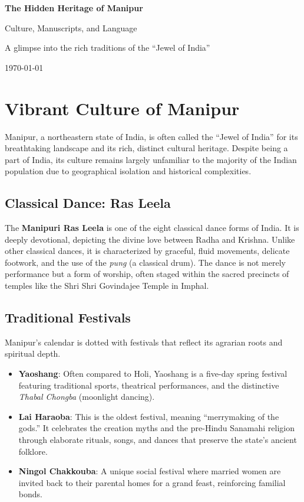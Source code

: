 \documentclass{article}
\begin{document}
\begin{titlepage}
    \centering
    \vspace*{2cm}
    {\Huge\bfseries The Hidden Heritage of Manipur\par}
    \vspace{1cm}
    {\Large Culture, Manuscripts, and Language\par}
    \vspace{2cm}
    {\large A glimpse into the rich traditions of the “Jewel of India”\par}
    \vspace{3cm}
    {\today\par}
\end{titlepage}

\tableofcontents
\newpage

\section{Vibrant Culture of Manipur}
Manipur, a northeastern state of India, is often called the “Jewel of India” for its breathtaking landscape and its rich, distinct cultural heritage. Despite being a part of India, its culture remains largely unfamiliar to the majority of the Indian population due to geographical isolation and historical complexities.

\subsection{Classical Dance: Ras Leela}
The \textbf{Manipuri Ras Leela} is one of the eight classical dance forms of India. It is deeply devotional, depicting the divine love between Radha and Krishna. Unlike other classical dances, it is characterized by graceful, fluid movements, delicate footwork, and the use of the \textit{pung} (a classical drum). The dance is not merely performance but a form of worship, often staged within the sacred precincts of temples like the Shri Shri Govindajee Temple in Imphal.

\subsection{Traditional Festivals}
Manipur’s calendar is dotted with festivals that reflect its agrarian roots and spiritual depth.
\begin{itemize}
    \item \textbf{Yaoshang}: Often compared to Holi, Yaoshang is a five-day spring festival featuring traditional sports, theatrical performances, and the distinctive \textit{Thabal Chongba} (moonlight dancing).
    \item \textbf{Lai Haraoba}: This is the oldest festival, meaning “merrymaking of the gods.” It celebrates the creation myths and the pre-Hindu Sanamahi religion through elaborate rituals, songs, and dances that preserve the state’s ancient folklore.
    \item \textbf{Ningol Chakkouba}: A unique social festival where married women are invited back to their parental homes for a grand feast, reinforcing familial bonds.
\end{itemize}
\end{document}
